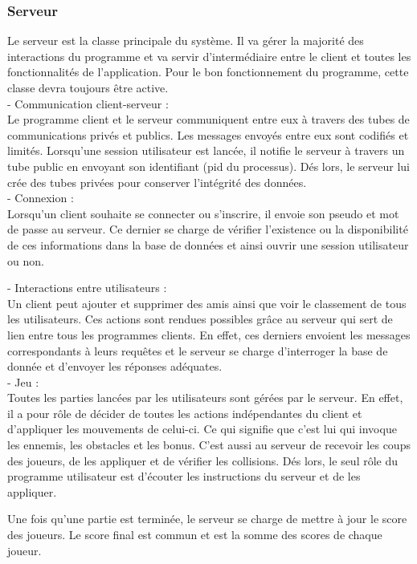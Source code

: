 \documentclass[a4paper,12pt]{article}
\begin{document}
\subsubsection{Serveur}
Le serveur est la classe principale du système. Il va gérer la majorité des interactions du programme et va servir d'intermédiaire entre le client et toutes les fonctionnalités de l'application. Pour le bon fonctionnement du programme, cette classe devra toujours être active.\\

- Communication client-serveur : \\
Le programme client et le serveur communiquent entre eux à travers des tubes de communications privés et publics. Les messages envoyés entre eux sont codifiés et limités.
Lorsqu'une session utilisateur est lancée, il notifie le serveur à travers un tube public en envoyant son identifiant (pid du processus). 
Dés lors, le serveur lui crée des tubes privées pour conserver l'intégrité des données.\\

- Connexion : \\
Lorsqu'un client souhaite se connecter ou s'inscrire, il envoie son pseudo et mot de passe au serveur. Ce dernier se charge de vérifier l'existence ou la disponibilité de ces informations dans la base de données et ainsi ouvrir une session utilisateur ou non. 

- Interactions entre utilisateurs : \\
Un client peut ajouter et supprimer des amis ainsi que voir le classement de tous les utilisateurs. 
Ces actions sont rendues possibles grâce au serveur qui sert de lien entre tous les programmes clients. 
En effet, ces derniers envoient les messages correspondants à leurs requêtes et le serveur se charge d'interroger la base de donnée et d'envoyer les réponses adéquates. \\

- Jeu : \\
Toutes les parties lancées par les utilisateurs sont gérées par le serveur. En effet, il a pour rôle de décider de toutes les actions indépendantes du client et d'appliquer les mouvements de celui-ci.
Ce qui signifie que c'est lui qui invoque les ennemis, les obstacles et les bonus. C'est aussi au serveur de recevoir les coups des joueurs, de les appliquer et de vérifier les collisions.
Dés lors, le seul rôle du programme utilisateur est d'écouter les instructions du serveur et de les appliquer. 

Une fois qu'une partie est terminée, le serveur se charge de mettre à jour le score des joueurs. Le score final est commun et est la somme des scores de chaque joueur.
\end{document}
